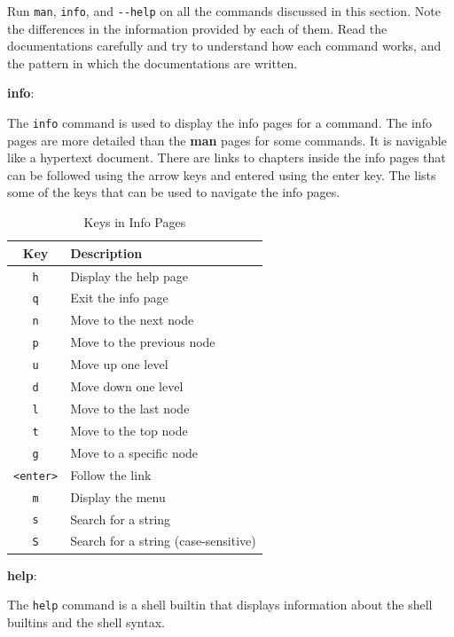 \begin{exercise}
  Run \texttt{man}, \texttt{info}, and \texttt{-{}-help} on all the commands discussed in this section.
  Note the differences in the information provided by each of them.
  Read the documentations carefully and try to understand how each command works, and the pattern in which the documentations are written.
\end{exercise}

\textbf{info}:

The \texttt{info} command is used to display the info pages for a command.
The info pages are more detailed than the \textbf{man} pages for some commands.
It is navigable like a hypertext document.
There are links to chapters inside the info pages that can be followed using the arrow keys and entered using the enter key.
The  lists some of the keys that can be used to navigate the info pages.

\begin{table}[h!]
\caption{Keys in Info Pages}
\begin{tabular}{ c l }
  \toprule
 Key & Description \\
 \midrule
  \texttt{h} & Display the help page \\
  \texttt{q} & Exit the info page \\
  \texttt{n} & Move to the next node \\
  \texttt{p} & Move to the previous node \\
  \texttt{u} & Move up one level \\
  \texttt{d} & Move down one level \\
  \texttt{l} & Move to the last node \\
  \texttt{t} & Move to the top node \\
  \texttt{g} & Move to a specific node \\
  \texttt{<enter>} & Follow the link \\
  \texttt{m} & Display the menu \\
  \texttt{s} & Search for a string \\
  \texttt{S} & Search for a string (case-sensitive) \\
  \bottomrule
\end{tabular}
\end{table}

\textbf{help}:

The \texttt{help} command is a shell builtin that displays information about the shell builtins and the shell syntax.

